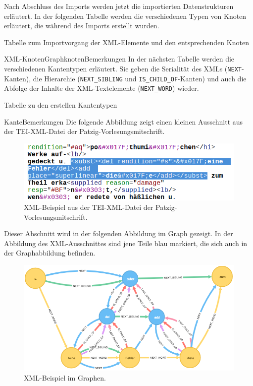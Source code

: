 Nach Abschluss des Imports werden jetzt die importierten Datenstrukturen
erläutert. In der folgenden Tabelle werden die verschiedenen Typen von
Knoten erläutert, die während des Imports erstellt wurden.

Tabelle zum Importvorgang der XML-Elemente und den entsprechenden Knoten

\textbar XML-Knoten\textbar Graphknoten\textbar Bemerkungen\textbar{} In
der nächsten Tabelle werden die verschiedenen Kantentypen erläutert. Sie
geben die Serialität des XMLs (\texttt{NEXT}-Kanten), die Hierarchie
(\texttt{NEXT\_SIBLING} und \texttt{IS\_CHILD\_OF}-Kanten) und auch die
Abfolge der Inhalte der XML-Textelemente (\texttt{NEXT\_WORD}) wieder.

Tabelle zu den erstellen Kantentypen

\textbar Kante\textbar Bemerkungen\textbar{} Die folgende Abbildung
zeigt einen kleinen Ausschnitt aus der TEI-XML-Datei der
Patzig-Vorlesungsmitschrift.

\begin{figure}
\centering
\includegraphics{Bilder/TEI2Graph/subst-xml-Beispiel.png}
\caption{XML-Beispiel aus der TEI-XML-Datei der
Patzig-Vorlesungsmitschrift.}
\end{figure}

Dieser Abschnitt wird in der folgenden Abbildung im Graph gezeigt. In
der Abbildung des XML-Ausschnittes sind jene Teile blau markiert, die
sich auch in der Graphabbildung befinden.

\begin{figure}
\centering
\includegraphics{Bilder/TEI2Graph/xml-importer-datenmodell.png}
\caption{XML-Beispiel im Graphen.}
\end{figure}

